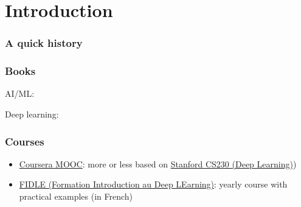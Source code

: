 \section{Introduction}

\begin{frame}
  \frametitle{A quick history}

\end{frame}

\begin{frame}
  \frametitle{Books}

  \nocite{*}

  AI/ML:
  \printbibliography[heading=none,category=general]

  Deep learning:
  \printbibliography[heading=none,category=deep_learning]
\end{frame}

\begin{frame}
  \frametitle{Courses}

  \begin{itemize}
  \item
    \href{https://www.coursera.org/specializations/machine-learning-introduction}{Coursera
      MOOC}:
    more or less based on \href{https://cs230.stanford.edu/}{Stanford CS230 (Deep Learning)})
  \item \href{https://fidle.cnrs.fr/}{FIDLE (Formation Introduction au Deep LEarning)}: yearly course with practical examples (in French)
  \end{itemize}
\end{frame}
